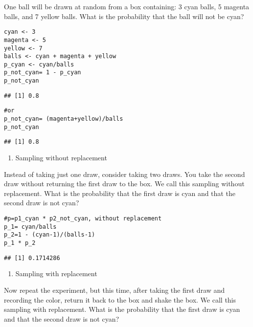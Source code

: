 \documentclass[
]{article}
\providecommand{\tightlist}{%
  \setlength{\itemsep}{0pt}\setlength{\parskip}{0pt}}
\begin{document}
One ball will be drawn at random from a box containing: 3 cyan balls, 5
magenta balls, and 7 yellow balls. What is the probability that the ball
will not be cyan?

\begin{verbatim}
cyan <- 3
magenta <- 5
yellow <- 7
balls <- cyan + magenta + yellow
p_cyan <- cyan/balls
p_not_cyan= 1 - p_cyan
p_not_cyan
\end{verbatim}

\begin{verbatim}
## [1] 0.8
\end{verbatim}

\begin{verbatim}
#or
p_not_cyan= (magenta+yellow)/balls
p_not_cyan
\end{verbatim}

\begin{verbatim}
## [1] 0.8
\end{verbatim}

\begin{enumerate}
\def\labelenumi{\arabic{enumi}.}
\setcounter{enumi}{2}
\tightlist
\item
  Sampling without replacement
\end{enumerate}

Instead of taking just one draw, consider taking two draws. You take the
second draw without returning the first draw to the box. We call this
sampling without replacement. What is the probability that the first
draw is cyan and that the second draw is not cyan?

\begin{verbatim}
#p=p1_cyan * p2_not_cyan, without replacement
p_1= cyan/balls 
p_2=1 - (cyan-1)/(balls-1)
p_1 * p_2
\end{verbatim}

\begin{verbatim}
## [1] 0.1714286
\end{verbatim}

\begin{enumerate}
\def\labelenumi{\arabic{enumi}.}
\setcounter{enumi}{3}
\tightlist
\item
  Sampling with replacement
\end{enumerate}

Now repeat the experiment, but this time, after taking the first draw
and recording the color, return it back to the box and shake the box. We
call this sampling with replacement. What is the probability that the
first draw is cyan and that the second draw is not cyan?
\end{document}
